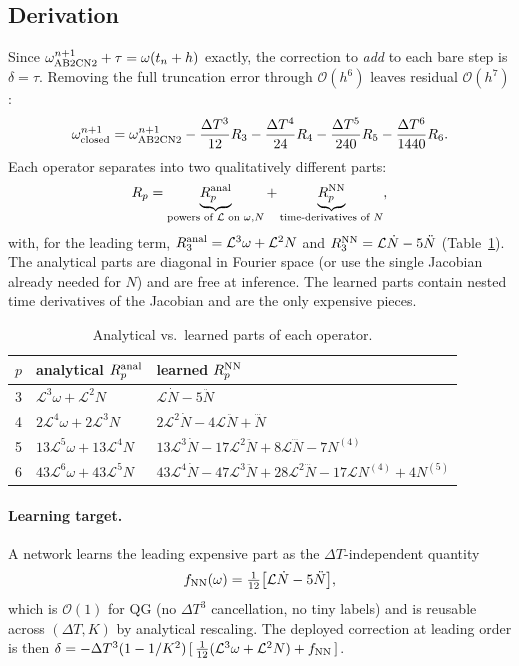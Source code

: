 \documentclass[11pt]{article}
\theoremstyle{plain}
\theoremstyle{definition}
\newcommand{\Lop}{\mathcal{L}}
\newcommand{\Ndot}{\dot{N}}
\newcommand{\Nddot}{\ddot{N}}
\newcommand{\Ndddot}{\dddot{N}}
\newcommand{\bO}{\mathcal{O}}
\newcommand{\DT}{\Delta T}
\begin{document}
\subsection{Derivation}
\label{sec:closure-derivation}
Since $\omega^{n+1}_{\rm AB2CN2}+\tau=\omega(t_n+h)$ exactly, the correction to
\emph{add} to each bare step is $\delta=\tau$. Removing the full truncation
error through $\bO(h^6)$ leaves residual $\bO(h^7)$:
\begin{equation}
\omega^{n+1}_{\rm closed}=\omega^{n+1}_{\rm AB2CN2}
-\frac{\DT^3}{12}R_3-\frac{\DT^4}{24}R_4-\frac{\DT^5}{240}R_5
-\frac{\DT^6}{1440}R_6 .
\label{eq:closed}
\end{equation}
Each operator separates into two qualitatively different parts:
\begin{equation}
R_p=\underbrace{R_p^{\rm anal}}_{\text{powers of }\Lop\text{ on }\omega,N}
   +\underbrace{R_p^{\rm NN}}_{\text{time-derivatives of }N},
\end{equation}
with, for the leading term, $R_3^{\rm anal}=\Lop^3\omega+\Lop^2N$ and
$R_3^{\rm NN}=\Lop\Ndot-5\Nddot$ (Table~\ref{tab:split}). The analytical parts
are diagonal in Fourier space (or use the single Jacobian already needed for
$N$) and are free at inference. The learned parts contain nested time
derivatives of the Jacobian and are the only expensive pieces.
\begin{table}[h]
\centering\small
\caption{Analytical vs.\ learned parts of each operator.}
\label{tab:split}
\begin{tabular}{cll}
\toprule
$p$ & analytical $R_p^{\rm anal}$ & learned $R_p^{\rm NN}$ \\
\midrule
3 & $\Lop^3\omega+\Lop^2N$       & $\Lop\Ndot-5\Nddot$\\
4 & $2\Lop^4\omega+2\Lop^3N$     & $2\Lop^2\Ndot-4\Lop\Nddot+\Ndddot$\\
5 & $13\Lop^5\omega+13\Lop^4N$   & $13\Lop^3\Ndot-17\Lop^2\Nddot+8\Lop\Ndddot-7N^{(4)}$\\
6 & $43\Lop^6\omega+43\Lop^5N$   & $43\Lop^4\Ndot-47\Lop^3\Nddot+28\Lop^2\Ndddot-17\Lop N^{(4)}+4N^{(5)}$\\
\bottomrule
\end{tabular}
\end{table}

\paragraph{Learning target.}
A network learns the leading expensive part as the $\DT$-independent quantity
\begin{equation}
f_{\rm NN}(\omega)=\tfrac{1}{12}\big[\Lop\Ndot-5\Nddot\big],
\label{eq:target}
\end{equation}
which is $\bO(1)$ for QG (no $\DT^3$ cancellation, no tiny labels) and is
reusable across $(\DT,K)$ by analytical rescaling. The deployed correction at
leading order is then
$\delta=-\DT^3(1-1/K^2)\,[\,\tfrac1{12}(\Lop^3\omega+\Lop^2N)+f_{\rm NN}\,]$.
\end{document}

